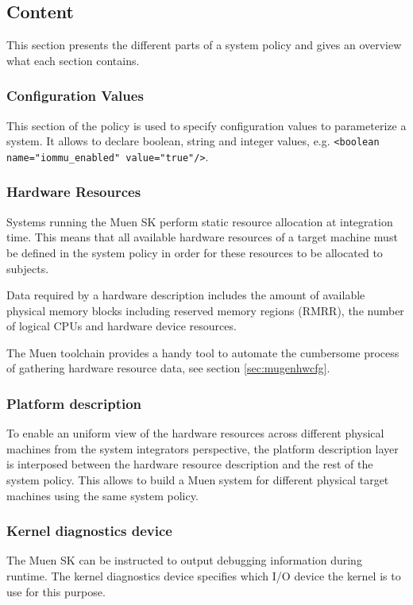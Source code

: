 \documentclass[a4paper,twoside,titlepage]{article}
\begin{document}
\subsection{Content}
This section presents the different parts of a system policy and gives an
overview what each section contains.

\subsubsection{Configuration Values}
This section of the policy is used to specify configuration values to
parameterize a system. It allows to declare boolean, string and integer values,
e.g. \texttt{<boolean name="iommu\_enabled" value="true"/>}.

\subsubsection{Hardware Resources}
Systems running the Muen SK perform static resource allocation at integration
time. This means that all available hardware resources of a target machine must
be defined in the system policy in order for these resources to be allocated to
subjects.

Data required by a hardware description includes the amount of available
physical memory blocks including reserved memory regions (RMRR), the number of
logical CPUs and hardware device resources.

The Muen toolchain provides a handy tool to automate the cumbersome process of
gathering hardware resource data, see section \ref{sec:mugenhwcfg}.

\subsubsection{Platform description}
To enable an uniform view of the hardware resources across different physical
machines from the system integrators perspective, the platform description layer
is interposed between the hardware resource description and the rest of the
system policy. This allows to build a Muen system for different physical target
machines using the same system policy.

\subsubsection{Kernel diagnostics device}
The Muen SK can be instructed to output debugging information during runtime.
The kernel diagnostics device specifies which I/O device the kernel is to use
for this purpose.
\end{document}
